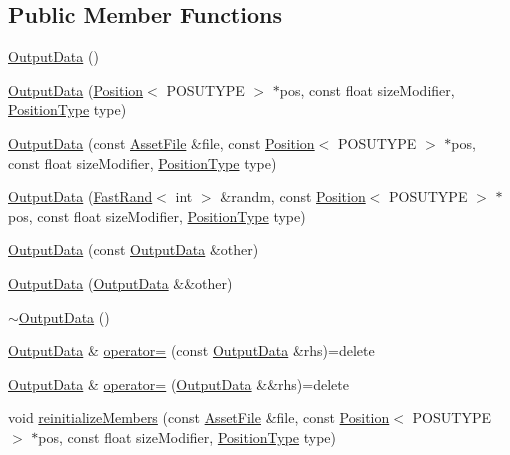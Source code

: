 \subsection*{Public Member Functions}
\begin{DoxyCompactItemize}
\item 
\hyperlink{struct_output_data_a25dd66307e7a48c4bc0d25e0016238fb}{Output\-Data} ()
\item 
\hyperlink{struct_output_data_a5f9343b49b12d6eaebcf0a4f97091a4d}{Output\-Data} (\hyperlink{struct_position}{Position}$<$ P\-O\-S\-U\-T\-Y\-P\-E $>$ $\ast$pos, const float size\-Modifier, \hyperlink{_output_data_8hpp_aa80fe4e9a559009407475c9587214b48}{Position\-Type} type)
\item 
\hyperlink{struct_output_data_a4d1b3008b1fb7dbb4cf9de8e89414f78}{Output\-Data} (const \hyperlink{struct_asset_file}{Asset\-File} \&file, const \hyperlink{struct_position}{Position}$<$ P\-O\-S\-U\-T\-Y\-P\-E $>$ $\ast$pos, const float size\-Modifier, \hyperlink{_output_data_8hpp_aa80fe4e9a559009407475c9587214b48}{Position\-Type} type)
\item 
\hyperlink{struct_output_data_a31419d6be305d81146da03acf50af852}{Output\-Data} (\hyperlink{class_fast_rand}{Fast\-Rand}$<$ int $>$ \&randm, const \hyperlink{struct_position}{Position}$<$ P\-O\-S\-U\-T\-Y\-P\-E $>$ $\ast$pos, const float size\-Modifier, \hyperlink{_output_data_8hpp_aa80fe4e9a559009407475c9587214b48}{Position\-Type} type)
\item 
\hyperlink{struct_output_data_a40e2554a288f7e546593eb866cdd1baf}{Output\-Data} (const \hyperlink{struct_output_data}{Output\-Data} \&other)
\item 
\hyperlink{struct_output_data_ab73d0b798428ee36881b61250bd152ac}{Output\-Data} (\hyperlink{struct_output_data}{Output\-Data} \&\&other)
\item 
\hyperlink{struct_output_data_ab9a358e297a61ab8c134376ddddf1c13}{$\sim$\-Output\-Data} ()
\item 
\hyperlink{struct_output_data}{Output\-Data} \& \hyperlink{struct_output_data_ad95e5bfff9550c7290c966887e50dd6d}{operator=} (const \hyperlink{struct_output_data}{Output\-Data} \&rhs)=delete
\item 
\hyperlink{struct_output_data}{Output\-Data} \& \hyperlink{struct_output_data_acaaf3bcc5ca785c4b96518215d7ecb82}{operator=} (\hyperlink{struct_output_data}{Output\-Data} \&\&rhs)=delete
\item 
void \hyperlink{struct_output_data_ac9c208239b472eea752f3605b155c713}{reinitialize\-Members} (const \hyperlink{struct_asset_file}{Asset\-File} \&file, const \hyperlink{struct_position}{Position}$<$ P\-O\-S\-U\-T\-Y\-P\-E $>$ $\ast$pos, const float size\-Modifier, \hyperlink{_output_data_8hpp_aa80fe4e9a559009407475c9587214b48}{Position\-Type} type)

\end{DoxyCompactItemize}
